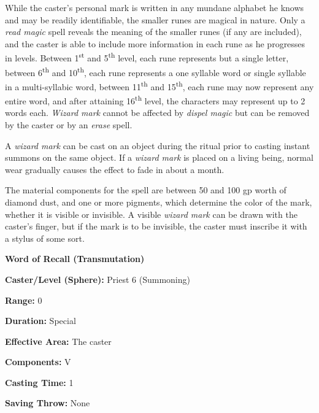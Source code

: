 \begin{multicols}{2}
While the caster's personal mark is written in any mundane alphabet he knows and may be readily identifiable, the smaller runes are magical in nature.  Only a \textit{read magic} spell reveals the meaning of the smaller runes (if any are included), and the caster is able to include more information in each rune as he progresses in levels.  Between 1\textsuperscript{st} and 5\textsuperscript{th} level, each rune represents but a single letter, between 6\textsuperscript{th} and 10\textsuperscript{th}, each rune represents a one syllable word or single syllable in a multi-syllabic word, between 11\textsuperscript{th} and 15\textsuperscript{th}, each rune may now represent any entire word, and after attaining 16\textsuperscript{th} level, the characters may represent up to 2 words each.  \textit{Wizard mark} cannot be affected by \textit{dispel magic} but can be removed by the caster or by an \textit{erase} spell. 

A \textit{wizard mark} can be cast on an object during the ritual prior to casting instant summons on the same object.  If a \textit{wizard mark} is placed on a living being, normal wear gradually causes the effect to fade in about a month. 

The material components for the spell are between 50 and 100 gp worth of diamond dust, and one or more pigments, which determine the color of the mark, whether it is visible or invisible.  A visible \textit{wizard mark} can be drawn with the caster's finger, but if the mark is to be invisible, the caster must inscribe it with a stylus of some sort.

\vspace{1em}

\noindent
\begin{minipage}{\columnwidth}

\noindent \textbf{Word of Recall (Transmutation)}

\noindent \textbf{Caster/Level (Sphere):} Priest 6 (Summoning)

\noindent \textbf{Range:} 0

\noindent \textbf{Duration:} Special

\noindent \textbf{Effective Area:} The caster

\noindent \textbf{Components:} V

\noindent \textbf{Casting Time:} 1

\noindent \textbf{Saving Throw:} None

\end{minipage}


\end{multicols}
